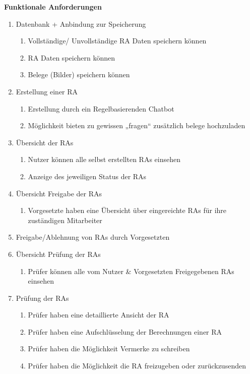 \textbf{Funktionale Anforderungen}
\begin{enumerate}
	\item Datenbank + Anbindung zur Speicherung
	\begin{enumerate}
		\item Vollständige/ Unvollständige RA Daten speichern können
		\item RA Daten speichern können
		\item Belege (Bilder) speichern können
	\end{enumerate}
	\item Erstellung einer RA
	\begin{enumerate}
		\item Erstellung durch ein Regelbasierenden Chatbot
		\item Möglichkeit bieten zu gewissen „fragen“ zusätzlich belege hochzuladen
	\end{enumerate}
	\item Übersicht der RAs
	\begin{enumerate}
		\item Nutzer können alle selbst erstellten RAs einsehen
		\item Anzeige des jeweiligen Status der RAs
	\end{enumerate}
	\item Übersicht Freigabe der RAs
	\begin{enumerate}
		\item Vorgesetzte haben eine Übersicht über eingereichte RAs für ihre zuständigen Mitarbeiter
	\end{enumerate}
	\item Freigabe/Ablehnung von RAs durch Vorgesetzten
	\item Übersicht Prüfung der RAs
	\begin{enumerate}
		\item Prüfer können alle vom Nutzer \& Vorgesetzten Freigegebenen RAs einsehen
	\end{enumerate}
	\item Prüfung der RAs
	\begin{enumerate}
		\item Prüfer haben eine detaillierte Ansicht der RA
		\item Prüfer haben eine Aufschlüsselung der Berechnungen einer RA
		\item Prüfer haben die Möglichkeit Vermerke zu schreiben
		\item Prüfer haben die Möglichkeit die RA freizugeben oder zurückzusenden 
	\end{enumerate}

\end{enumerate}
